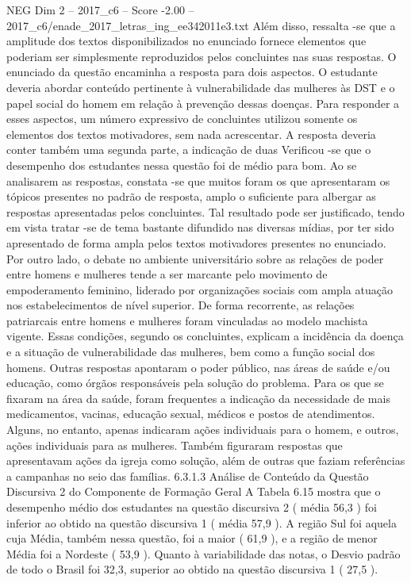 \begin{textsample}{NEG Dim 2 – 2017\_c6 – Score -2.00 – 2017\_c6/enade\_2017\_letras\_ing\_ee342011e3.txt}
Além disso, ressalta -se que a amplitude dos textos disponibilizados no enunciado fornece elementos que poderiam ser simplesmente reproduzidos pelos concluintes nas suas respostas.
O enunciado da questão encaminha a resposta para dois aspectos.
O estudante deveria abordar conteúdo pertinente à vulnerabilidade das mulheres às DST e o papel social do homem em relação à prevenção dessas doenças.
Para responder a esses aspectos, um número expressivo de concluintes utilizou somente os elementos dos textos motivadores, sem nada acrescentar.
A resposta deveria conter também uma segunda parte, a indicação de duas Verificou -se que o desempenho dos estudantes nessa questão foi de médio para bom.
Ao se analisarem as respostas, constata -se que muitos foram os que apresentaram os tópicos presentes no padrão de resposta, amplo o suficiente para albergar as respostas apresentadas pelos concluintes.
Tal resultado pode ser justificado, tendo em vista tratar -se de tema bastante difundido nas diversas mídias, por ter sido apresentado de forma ampla pelos textos motivadores presentes no enunciado.
Por outro lado, o debate no ambiente universitário sobre as relações de poder entre homens e mulheres tende a ser marcante pelo movimento de empoderamento feminino, liderado por organizações sociais com ampla atuação nos estabelecimentos de nível superior.
De forma recorrente, as relações patriarcais entre homens e mulheres foram vinculadas ao modelo machista vigente.
Essas condições, segundo os concluintes, explicam a incidência da doença e a situação de vulnerabilidade das mulheres, bem como a função social dos homens.
Outras respostas apontaram o poder público, nas áreas de saúde e/ou educação, como órgãos responsáveis pela solução do problema.
Para os que se fixaram na área da saúde, foram frequentes a indicação da necessidade de mais medicamentos, vacinas, educação sexual, médicos e postos de atendimentos.
Alguns, no entanto, apenas indicaram ações individuais para o homem, e outros, ações individuais para as mulheres.
Também figuraram respostas que apresentavam ações da igreja como solução, além de outras que faziam referências a campanhas no seio das famílias. 6.3.1.3 Análise de Conteúdo da Questão Discursiva 2 do Componente de Formação Geral A Tabela 6.15 mostra que o desempenho médio dos estudantes na questão discursiva 2 ( média 56,3 ) foi inferior ao obtido na questão discursiva 1 ( média 57,9 ).
A região Sul foi aquela cuja Média, também nessa questão, foi a maior ( 61,9 ), e a região de menor Média foi a Nordeste ( 53,9 ).
Quanto à variabilidade das notas, o Desvio padrão de todo o Brasil foi 32,3, superior ao obtido na questão discursiva 1 ( 27,5 ).

\end{textsample}
